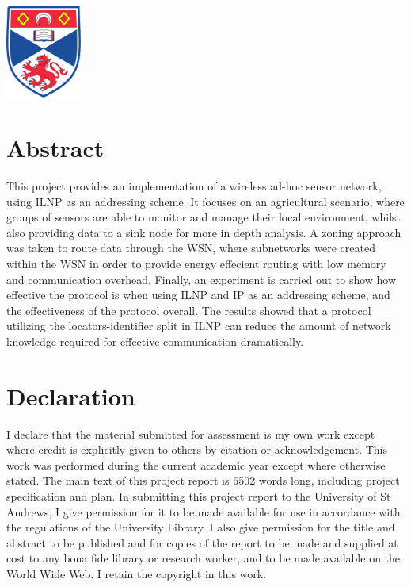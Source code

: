 \documentclass[12pt]{article}
\begin{document}
\begin{titlepage}
\includegraphics[width = 2.5cm]{images/standrewslogo.png}
 

\vfill %

\end{titlepage}


\part*{Abstract}

This project provides an implementation of a wireless ad-hoc sensor network, using ILNP as an addressing scheme. It focuses on an agricultural scenario, where groups of sensors are able to monitor and manage their local environment, whilst also providing data to a sink node for more in depth analysis. A zoning approach was taken to route data through the WSN, where subnetworks were created within the WSN in order to provide energy effecient routing with low memory and communication overhead. Finally, an experiment is carried out to show how effective the protocol is when using ILNP and IP as an addressing scheme, and the effectiveness of the protocol overall. The results showed that a protocol utilizing the locators-identifier split in ILNP can reduce the amount of network knowledge required for effective communication dramatically.

\part*{Declaration}
I declare that the material submitted for
assessment is my own work except where credit is
explicitly given to others by citation or
acknowledgement. This work was performed during
the current academic year except where otherwise
stated.
The main text of this project report is 6502 words long, including project specification and plan.
In submitting this project report to the University of
St Andrews, I give permission for it to be made
available for use in accordance with the regulations of
the University Library. I also give permission for
the title and abstract to be published and for copies of
the report to be made and supplied at cost to any bona
fide library or research worker, and to be made
available on the World Wide Web. I retain the
copyright in this work.
\end{document}
